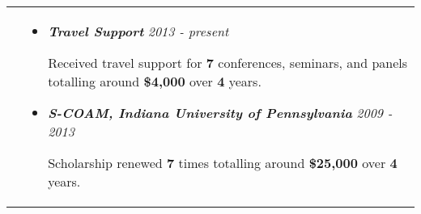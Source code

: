 \documentclass[10pt]{article}
\begin{document}
\vspace*{-\baselineskip}
\hskip-1.7in
\begin{tabularx}{1.5\linewidth}{>{\raggedleft\scshape}p{3cm}X}

  &\begin{itemize}
    \setlength\itemsep{.005em}  
          
\item \textbf{\textit{Travel Support}} \hspace{98.5 mm}\textit{2013 - present}
  
            Received travel support for \textbf{7} conferences, seminars, and panels totalling around \textbf{\$4,000} over \textbf{4} years.
                      
          
\item \textbf{\textit{S-COAM, Indiana University of Pennsylvania}} \hspace{42 mm}\textit{2009 - 2013}
  
            Scholarship renewed \textbf{7} times totalling around \textbf{\$25,000} over \textbf{4} years.
            

  \end{itemize} 

\end{tabularx}
\end{document}
